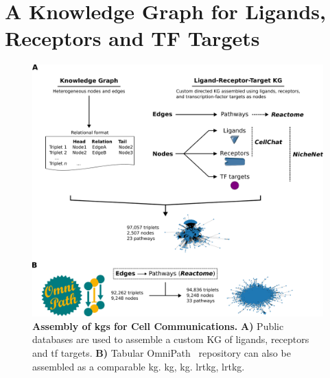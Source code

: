 

\newpage
\section{A Knowledge Graph for Ligands, Receptors and TF Targets}

\begin{figure}[H]
    \centering
    \includegraphics{06kg/figs/6KG_kg.png}
    \caption{\textbf{Assembly of \acrshort{kg}s for Cell Communications.} \textbf{A)} Public databases are used to assemble a custom KG of ligands, receptors and \acrshort{tf} targets. \textbf{B)} Tabular OmniPath~\cite{turei_integrated_2021} repository can also be assembled as a comparable \acrshort{kg}. \acrshort{kg}, \acrlong{kg}. \acrshort{lrtkg}, \acrlong{lrtkg}.}
    \label{fig:6kg}
\end{figure}


